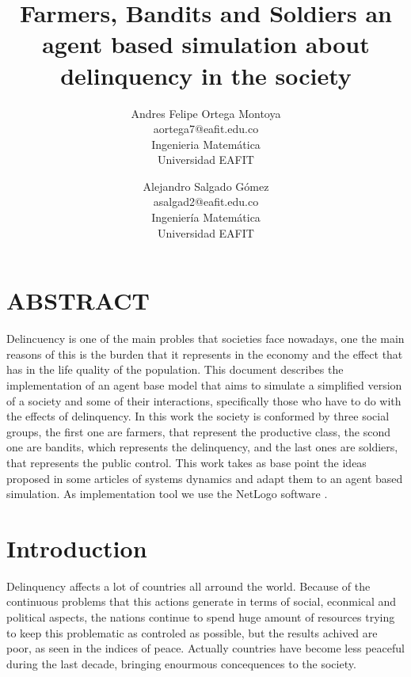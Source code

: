 \documentclass{wscpaperproc}
\begin{document}

\title{Farmers, Bandits and Soldiers an agent based simulation about
       delinquency in the society}

\author{Andres Felipe Ortega Montoya\\ [12pt]
aortega7@eafit.edu.co\\
Ingenieria Matemática\\
Universidad EAFIT\\
\and
Alejandro Salgado Gómez\\[12pt]
asalgad2@eafit.edu.co\\
Ingeniería Matemática\\
Universidad EAFIT\\
}

\maketitle

\section*{ABSTRACT}
Delincuency is one of the main probles that societies face nowadays,
one the main reasons of this is the burden that it represents in the
economy and the effect that has in the life quality of the population.
This document describes the implementation of an agent base model that aims to
simulate a simplified version of a society and some of their interactions,
specifically those who have to do with the effects of delinquency.
In this work the society is conformed by three social groups, the
first one are farmers, that represent the productive class, the scond
one are bandits, which represents the delinquency, and the last ones
are soldiers, that represents the public control. This work takes as base point
the ideas proposed in some articles of systems dynamics and adapt them to an
agent based simulation. As implementation tool we use the NetLogo software
\cite{netlogo}.

\section{Introduction}

Delinquency affects a lot of countries all arround the world. Because of the
continuous problems that this actions generate in terms of social, econmical and
political aspects, the nations continue to spend huge amount of resources
trying to keep this problematic as controled as possible, but the results achived
are poor, as seen in the indices of peace. Actually countries have become
less peaceful during the last decade, bringing enourmous concequences to the
society. \cite{peace} \cite{violence}
\end{document}

